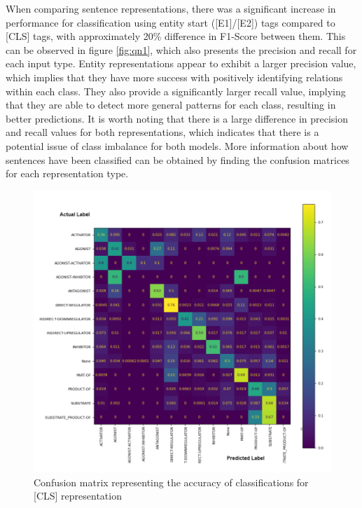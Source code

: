 \documentclass{l4proj}
\begin{document}
When comparing sentence representations, there was a significant increase in performance for classification using entity start ([E1]/[E2]) tags compared to [CLS] tags, with approximately 20\% difference in F1-Score between them. This can be observed in figure \ref{fig:qn1}, which also presents the precision and recall for each input type. Entity representations appear to exhibit a larger precision value, which implies that they have more success with positively identifying relations within each class. They also provide a significantly larger recall value, implying that they are able to detect more general patterns for each class, resulting in better predictions. It is worth noting that there is a large difference in precision and recall values for both representations, which indicates that there is a potential issue of class imbalance for both models. More information about how sentences have been classified can be obtained by finding the confusion matrices for each representation type.

\begin{figure}[htb]
    \centering
    \includegraphics[width=16cm]{images/cls_mult.png}
  \caption{Confusion matrix representing the accuracy of classifications for [CLS] representation}
  \label{fig:cls_mat}
\end{figure}
\end{document}
